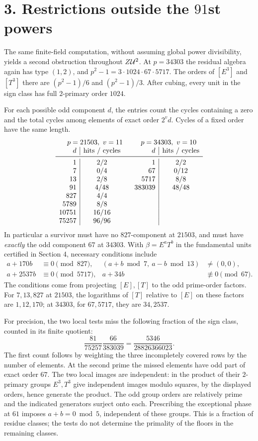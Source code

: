 \documentclass[11pt,a4paper,oneside,openany]{book}
\newcommand{\localhead}[1]{\needspace{5\baselineskip}\section*{\color{ink}#1}}
\let\sect\localhead\let\secx\localhead\let\head\localhead
\begin{document}
\sect{3. Restrictions outside the $91$st powers}
The same finite-field computation, without assuming global power divisibility, yields a second obstruction throughout $Z\mathcal U^2$. At $p=34303$ the residual algebra again has type $(1,2)$, and $p^2-1=3\cdot1024\cdot67\cdot5717$. The orders of $[E^3]$ and $[T^3]$ there are $(p^2-1)/6$ and $(p^2-1)/3$. After cubing, every unit in the sign class has full $2$-primary order $1024$.

For each possible odd component $d$, the entries count the cycles containing a zero and the total cycles among elements of exact order $2^v d$. Cycles of a fixed order have the same length.
\[
\begin{array}{r|c@{\qquad}r|c}
\multicolumn{2}{c}{p=21503,\ v=11}&\multicolumn{2}{c}{p=34303,\ v=10}\\
d&\text{hits / cycles}&d&\text{hits / cycles}\\\midrule
1&2/2&1&2/2\\
7&0/4&67&0/12\\
13&2/8&5717&8/8\\
91&4/48&383039&48/48\\
827&4/4&&\\
5789&8/8&&\\
10751&16/16&&\\
75257&96/96&&
\end{array}
\]
In particular a survivor must have no $827$-component at $21503$, and must have \emph{exactly} the odd component $67$ at $34303$. With $\beta=E^aT^b$ in the fundamental units certified in Section 4, necessary conditions include
\[
\begin{aligned}
 a+170b&\equiv0\pmod{827},&
 (a+b\bmod7,\ a-b\bmod13)&\ne(0,0),\\
 a+2537b&\equiv0\pmod{5717},&
 a+34b&\not\equiv0\pmod{67}.
\end{aligned}
\]
The conditions come from projecting $[E],[T]$ to the odd prime-order factors. For $7,13,827$ at $21503$, the logarithms of $[T]$ relative to $[E]$ on these factors are $1,12,170$; at $34303$, for $67,5717$, they are $34,2537$.

For precision, the two local tests miss the following fraction of the sign class, counted in its finite quotient:
\[
  \frac{81}{75257}\frac{66}{383039}
        =\frac{5346}{28826366023}.
\]
The first count follows by weighting the three incompletely covered rows by the number of elements. At the second prime the missed elements have odd part of exact order $67$. The two local images are independent: in the product of their $2$-primary groups $E^3,T^3$ give independent images modulo squares, by the displayed orders, hence generate the product. The odd group orders are relatively prime and the indicated generators surject onto each. Prescribing the exceptional phase at $61$ imposes $a+b=0\bmod5$, independent of these groups. This is a fraction of residue classes; the tests do not determine the primality of the floors in the remaining classes.
\end{document}
